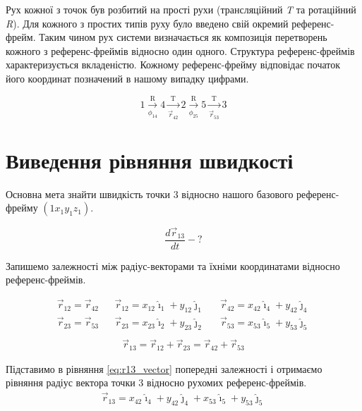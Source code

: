 \documentclass[12pt]{article}
\begin{document}
 	Рух кожної з точок був розбитий на прості рухи (трансляційний \textit{T} та ротаційний \textit{R}). Для кожного з простих типів руху було введено свій окремий референс-фрейм. Таким чином рух системи визначається як композиція перетворень кожного з референс-фреймів відносно один одного. Структура референс-фреймів характеризується вкладеністю. Кожному референс-фрейму відповідає початок його координат позначений в нашому випадку цифрами.
 	
 	\begin{equation}
 	\nonumber
 	1 \xrightarrow[\text{$\phi_{14}$}]{\text{R}} 4 \xrightarrow[\text{$\vec{r}_{42}$}]{\text{T}} 2 \xrightarrow[\text{$\phi_{25}$}]{\text{R}} 5 \xrightarrow[\text{$\vec{r}_{53}$}]{\text{T}} 3
 	\end{equation}
 	
 	\section*{Виведення рівняння швидкості}
 	Основна мета знайти швидкість точки 3 відносно нашого базового референс-фрейму $(1x_1y_1z_1)$.
 	
 	\begin{equation}
 	\nonumber
 	\frac {d \vec{r}_{13}} {d t} - ?
 	\end{equation}
 	
 	Запишемо залежності між радіус-векторами та їхніми координатами відносно референс-фреймів.

 	\begin{align*}
 	\vec{r}_{12} = \vec{r}_{42}  & & 	\vec{r}_{12} = x_{12} \hat{\imath}_{1} + y_{12} \hat{\jmath}_{1} & & \vec{r}_{42} = x_{42} \hat{\imath}_{4} + y_{42} \hat{\jmath}_{4} \\
 	\vec{r}_{23} = \vec{r}_{53} & &  \vec{r}_{23} = x_{23} \hat{\imath}_{2} + y_{23} \hat{\jmath}_{2} & &  \vec{r}_{53} = x_{53} \hat{\imath}_{5} + y_{53} \hat{\jmath}_{5}\\	
 	\end{align*}
 	\begin{gather}
 	\label {eq:r13_vector}
 	\vec{r}_{13} = \vec{r}_{12} + \vec{r}_{23} = \vec{r}_{42} + \vec{r}_{53} 
 	\end{gather}
 	
 	Підставимо в рівняння \ref{eq:r13_vector} попередні залежності і отримаємо рівняння радіус вектора точки 3 відносно рухомих  референс-фреймів.
 	\begin{gather}
 	 \label {eq:r13_xy}
 	 \vec{r}_{13} = x_{42} \hat{\imath}_{4} + y_{42} \hat{\jmath}_{4} + x_{53} \hat{\imath}_{5} + y_{53} \hat{\jmath}_{5}
 	\end{gather}
 	
\end{document}
